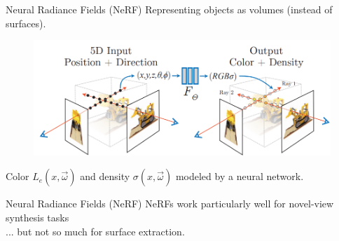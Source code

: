 \documentclass[10pt]{beamer}
\begin{document}
{
\begin{frame}{Neural Radiance Fields (NeRF)}
    Representing objects as volumes (instead of surfaces).
    \begin{figure}
        \centering
        \includegraphics[width=0.9\linewidth]{figures/vol/nerf.png}
    \end{figure}

    Color \(L_e(x, \vec{\omega})\) and density \(\sigma(x, \vec{\omega})\) modeled by a \alert{neural network}.
\end{frame}

\begin{frame}{Neural Radiance Fields (NeRF)}
    NeRFs work particularly well for \alert{novel-view synthesis} tasks \\

    ... but not so much for \alert{surface extraction}.


\end{frame}}
\end{document}

